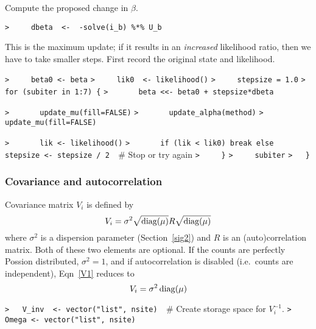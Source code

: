 \documentclass[a4paper]{article}
\begin{document}
Compute the proposed change in $\beta$.\par
\verb~>     dbeta  <-  -solve(i_b) %*% U_b~\par

This is the maximum update; if it results in an \emph{increased} likelihood ratio,
then we have to take smaller steps. First record the original state and likelihood.\par
\verb~>     beta0 <- beta~\newline
\verb~>     lik0  <- likelihood()~\newline
\verb~>     stepsize = 1.0~\newline
\verb~>     for (subiter in 1:7) {~\newline
\verb~>       beta <<- beta0 + stepsize*dbeta~\par

\verb~>       update_mu(fill=FALSE)~\newline
\verb~>       update_alpha(method)~\newline
\verb~>       update_mu(fill=FALSE)~\par

\verb~>       lik <- likelihood()~\newline
\verb~>       if (lik < lik0) break else stepsize <- stepsize / 2  ~{\sffamily\# Stop or try again}\newline
\verb~>     }~\newline
\verb~>     subiter~\newline
\verb~>   }~\par



\subsubsection{Covariance and autocorrelation \label{covariance}}\par

Covariance matrix $V_i$ is defined by
\begin{equation}
  V_i = \sigma^2 \sqrt{\operatorname{diag}(\mu)} R \sqrt{\operatorname{diag}(\mu)} \label{V1}
\end{equation}
where $\sigma^2$ is a dispersion parameter (Section~\ref{sig2})
and $R$ is an (auto)correlation matrix.
Both of these two elements are optional.
If the counts are perfectly Possion distributed, $\sigma^2=1$,
and if autocorrelation is disabled (i.e.\ counts are independent),
Eqn~\eqref{V1} reduces to
\begin{equation}
  V_i = \sigma^2 \operatorname{diag}(\mu) \label{V2}
\end{equation}\par
\verb~>   V_inv  <- vector("list", nsite)  ~{\sffamily\# Create storage space for $V_i^{-1}$.}\newline
\verb~>   Omega <- vector("list", nsite)~\par
\end{document}
